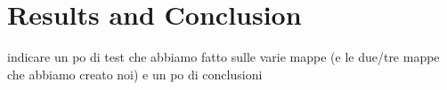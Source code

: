 \section{Results and Conclusion}
    indicare un po di test che abbiamo fatto sulle varie mappe (e le due/tre mappe che abbiamo creato noi) e un po di conclusioni
    